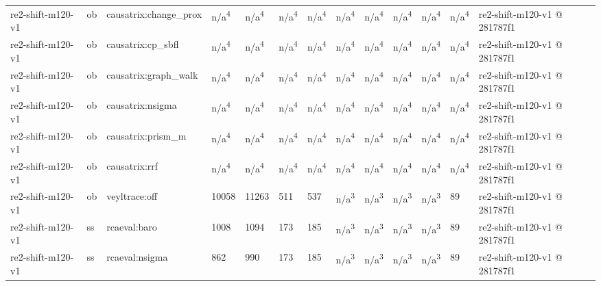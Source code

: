 \begin{table}[t]
\begin{tabular}{lllllllllllll}
re2-shift-m120-v1 & ob & causatrix:change\_prox & n/a\textsuperscript{4} & n/a\textsuperscript{4} & n/a\textsuperscript{4} & n/a\textsuperscript{4} & n/a\textsuperscript{4} & n/a\textsuperscript{4} & n/a\textsuperscript{4} & n/a\textsuperscript{4} & n/a\textsuperscript{4} & re2-shift-m120-v1 @ 281787f1 \\
re2-shift-m120-v1 & ob & causatrix:cp\_sbfl & n/a\textsuperscript{4} & n/a\textsuperscript{4} & n/a\textsuperscript{4} & n/a\textsuperscript{4} & n/a\textsuperscript{4} & n/a\textsuperscript{4} & n/a\textsuperscript{4} & n/a\textsuperscript{4} & n/a\textsuperscript{4} & re2-shift-m120-v1 @ 281787f1 \\
re2-shift-m120-v1 & ob & causatrix:graph\_walk & n/a\textsuperscript{4} & n/a\textsuperscript{4} & n/a\textsuperscript{4} & n/a\textsuperscript{4} & n/a\textsuperscript{4} & n/a\textsuperscript{4} & n/a\textsuperscript{4} & n/a\textsuperscript{4} & n/a\textsuperscript{4} & re2-shift-m120-v1 @ 281787f1 \\
re2-shift-m120-v1 & ob & causatrix:nsigma & n/a\textsuperscript{4} & n/a\textsuperscript{4} & n/a\textsuperscript{4} & n/a\textsuperscript{4} & n/a\textsuperscript{4} & n/a\textsuperscript{4} & n/a\textsuperscript{4} & n/a\textsuperscript{4} & n/a\textsuperscript{4} & re2-shift-m120-v1 @ 281787f1 \\
re2-shift-m120-v1 & ob & causatrix:prism\_m & n/a\textsuperscript{4} & n/a\textsuperscript{4} & n/a\textsuperscript{4} & n/a\textsuperscript{4} & n/a\textsuperscript{4} & n/a\textsuperscript{4} & n/a\textsuperscript{4} & n/a\textsuperscript{4} & n/a\textsuperscript{4} & re2-shift-m120-v1 @ 281787f1 \\
re2-shift-m120-v1 & ob & causatrix:rrf & n/a\textsuperscript{4} & n/a\textsuperscript{4} & n/a\textsuperscript{4} & n/a\textsuperscript{4} & n/a\textsuperscript{4} & n/a\textsuperscript{4} & n/a\textsuperscript{4} & n/a\textsuperscript{4} & n/a\textsuperscript{4} & re2-shift-m120-v1 @ 281787f1 \\
re2-shift-m120-v1 & ob & veyltrace:off & 10058 & 11263 & 511 & 537 & n/a\textsuperscript{3} & n/a\textsuperscript{3} & n/a\textsuperscript{3} & n/a\textsuperscript{3} & 89 & re2-shift-m120-v1 @ 281787f1 \\
re2-shift-m120-v1 & ss & rcaeval:baro & 1008 & 1094 & 173 & 185 & n/a\textsuperscript{3} & n/a\textsuperscript{3} & n/a\textsuperscript{3} & n/a\textsuperscript{3} & 89 & re2-shift-m120-v1 @ 281787f1 \\
re2-shift-m120-v1 & ss & rcaeval:nsigma & 862 & 990 & 173 & 185 & n/a\textsuperscript{3} & n/a\textsuperscript{3} & n/a\textsuperscript{3} & n/a\textsuperscript{3} & 89 & re2-shift-m120-v1 @ 281787f1 \\

\end{tabular}
\end{table}
